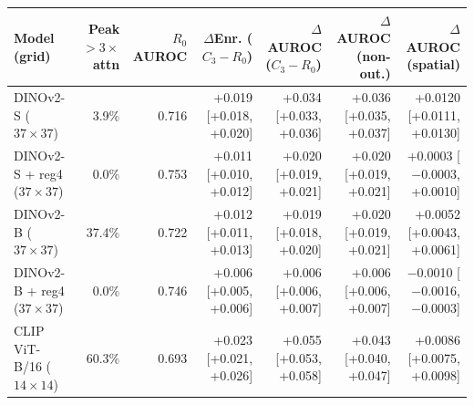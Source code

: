 \begin{tabular}{@{}lrrrrrr@{}}
\toprule
Model (grid) & Peak $>3\times$ attn & $R_0$ AUROC & $\Delta$Enr. ($C_3{-}R_0$) & $\Delta$AUROC ($C_3{-}R_0$) & $\Delta$AUROC (non-out.) & $\Delta$AUROC (spatial) \\
\midrule
DINOv2-S ($37{\times}37$) & 3.9\% & 0.716 & +0.019 [+0.018, +0.020] & +0.034 [+0.033, +0.036] & +0.036 [+0.035, +0.037] & +0.0120 [+0.0111, +0.0130] \\
DINOv2-S + reg4 ($37{\times}37$) & 0.0\% & 0.753 & +0.011 [+0.010, +0.012] & +0.020 [+0.019, +0.021] & +0.020 [+0.019, +0.021] & +0.0003 [$-$0.0003, +0.0010] \\
DINOv2-B ($37{\times}37$) & 37.4\% & 0.722 & +0.012 [+0.011, +0.013] & +0.019 [+0.018, +0.020] & +0.020 [+0.019, +0.021] & +0.0052 [+0.0043, +0.0061] \\
DINOv2-B + reg4 ($37{\times}37$) & 0.0\% & 0.746 & +0.006 [+0.005, +0.006] & +0.006 [+0.006, +0.007] & +0.006 [+0.006, +0.007] & $-$0.0010 [$-$0.0016, $-$0.0003] \\
CLIP ViT-B/16 ($14{\times}14$) & 60.3\% & 0.693 & +0.023 [+0.021, +0.026] & +0.055 [+0.053, +0.058] & +0.043 [+0.040, +0.047] & +0.0086 [+0.0075, +0.0098] \\
\bottomrule
\end{tabular}
